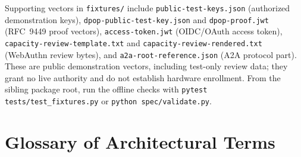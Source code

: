 Supporting vectors in \texttt{fixtures/} include \texttt{public-test-keys.json} (authorized demonstration keys), \texttt{dpop-public-test-key.json} and \texttt{dpop-proof.jwt} (RFC~9449 proof vectors), \texttt{access-token.jwt} (OIDC/OAuth access token), \texttt{capacity-review-template.txt} and \texttt{capacity-review-rendered.txt} (WebAuthn review bytes), and \texttt{a2a-root-reference.json} (A2A protocol part). These are public demonstration vectors, including test-only review data; they grant no live authority and do not establish hardware enrollment. From the sibling package root, run the offline checks with \texttt{pytest tests/test\_fixtures.py} or \texttt{python spec/validate.py}.

\section{Glossary of Architectural Terms}
\label{sec:app-glossary}

